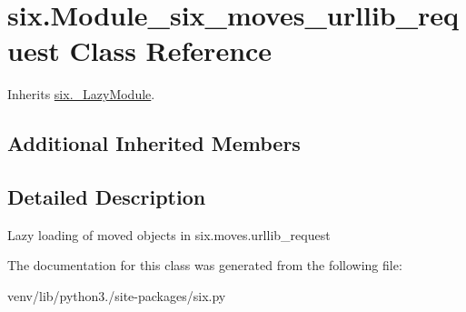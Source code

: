 \hypertarget{classsix_1_1_module__six__moves__urllib__request}{}\section{six.\+Module\+\_\+six\+\_\+moves\+\_\+urllib\+\_\+request Class Reference}
\label{classsix_1_1_module__six__moves__urllib__request}


Inherits \hyperlink{classsix_1_1___lazy_module}{six.\+\_\+\+Lazy\+Module}.

\subsection*{Additional Inherited Members}


\subsection{Detailed Description}
\begin{DoxyVerb}Lazy loading of moved objects in six.moves.urllib_request\end{DoxyVerb}
 

The documentation for this class was generated from the following file\+:\begin{DoxyCompactItemize}
\item 
venv/lib/python3./site-\/packages/six.\+py\end{DoxyCompactItemize}
